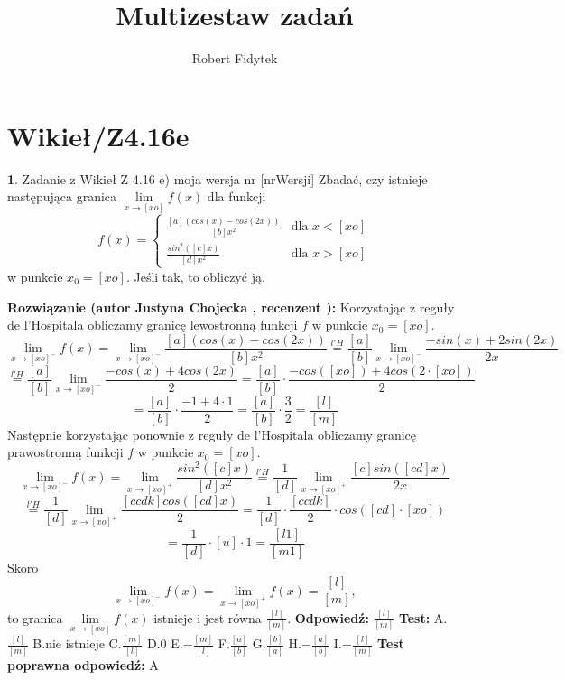 \documentclass[12pt, a4paper]{article}
\title{Multizestaw zadań}
\author{Robert Fidytek}
\date{}
\theoremstyle{definition} %
\newtheorem{zad}{}
\newcommand{\kategoria}[1]{\section{#1}} %
\newcommand{\zadStart}[1]{\begin{zad}#1\newline} %
\newcommand{\zadStop}{\end{zad}}   %
\newcommand{\rozwStart}[2]{\noindent \textbf{Rozwiązanie (autor #1 , recenzent #2): }\newline} %
\newcommand{\rozwStop}{\newline}                                            %
\newcommand{\odpStart}{\noindent \textbf{Odpowiedź:}\newline}    %
\newcommand{\odpStop}{\newline}                                             %
\newcommand{\testStart}{\noindent \textbf{Test:}\newline} %
\newcommand{\testStop}{\newline} %
\newcommand{\kluczStart}{\noindent \textbf{Test poprawna odpowiedź:}\newline} %
\newcommand{\kluczStop}{\newline} %
\begin{document}
\maketitle


\kategoria{Wikieł/Z4.16e}
\zadStart{Zadanie z Wikieł Z 4.16 e) moja wersja nr [nrWersji]}
Zbadać, czy istnieje następująca granica $\lim\limits_{x\to [xo]}f(x)$ dla funkcji 
$$
f(x)=\left\{\begin{array}{ll}
\frac{[a](cos(x)-cos(2x))}{[b]x^2} & \textrm{dla $x<[xo]$}\\
\frac{sin^{2}([c]x)}{[d]x^{2}} & \textrm{dla $x>[xo]$}
\end{array} \right.
$$
w punkcie $x_{0}=[xo]$. Jeśli tak, to obliczyć ją.
\zadStop
\rozwStart{Justyna Chojecka}{}
Korzystając z reguły de l'Hospitala obliczamy granicę lewostronną funkcji $f$ w punkcie $x_{0}=[xo]$.
$$\lim\limits_{x\to [xo]^{-}}f(x)=\lim\limits_{x\to [xo]^{-}}\frac{[a](cos(x)-cos(2x))}{[b]x^2} \overset{l'H}{=}\frac{[a]}{[b]} \lim\limits_{x\to [xo]^{-}}\frac{-sin(x)+2sin(2x)}{2x}$$$$\overset{l'H}{=}\frac{[a]}{[b]} \lim\limits_{x\to [xo]^{-}}\frac{-cos(x)+4cos(2x)}{2}=\frac{[a]}{[b]}\cdot \frac{-cos([xo])+4cos(2\cdot [xo])}{2}$$$$=\frac{[a]}{[b]}\cdot \frac{-1+4\cdot 1}{2}=\frac{[a]}{[b]}\cdot\frac{3}{2}=\frac{[l]}{[m]}$$
Następnie korzystając ponownie z reguły de l'Hospitala obliczamy granicę prawostronną funkcji $f$ w punkcie $x_{0}=[xo]$.
$$\lim\limits_{x\to [xo]^{-}}f(x)=\lim\limits_{x\to [xo]^{+}}\frac{sin^{2}([c]x)}{[d]x^{2}} \overset{l'H}{=}\frac{1}{[d]}\lim\limits_{x\to [xo]^{+}}\frac{[c]sin([cd]x)}{2x}$$$$\overset{l'H}{=}\frac{1}{[d]}\lim\limits_{x\to [xo]^{+}}\frac{[ccdk]cos([cd]x)}{2}=\frac{1}{[d]}\cdot \frac{[ccdk]}{2} \cdot cos([cd]\cdot [xo])$$$$=\frac{1}{[d]}\cdot [u]\cdot 1=\frac{[l1]}{[m1]}$$
Skoro 
$$\lim\limits_{x\to [xo]^{-}}f(x)=\lim\limits_{x\to [xo]^{+}}f(x)=\frac{[l]}{[m]},$$
to granica $\lim\limits_{x\to [xo]}f(x)$ istnieje i jest równa $\frac{[l]}{[m]}$.
\rozwStop
\odpStart
$\frac{[l]}{[m]}$
\odpStop
\testStart
A.$\frac{[l]}{[m]}$
B.nie istnieje
C.$\frac{[m]}{[l]}$
D.0
E.$-\frac{[m]}{[l]}$
F.$\frac{[a]}{[b]}$
G.$\frac{[b]}{[a]}$
H.$-\frac{[a]}{[b]}$
I.$-\frac{[l]}{[m]}$
\testStop
\kluczStart
A
\kluczStop
\end{document}
